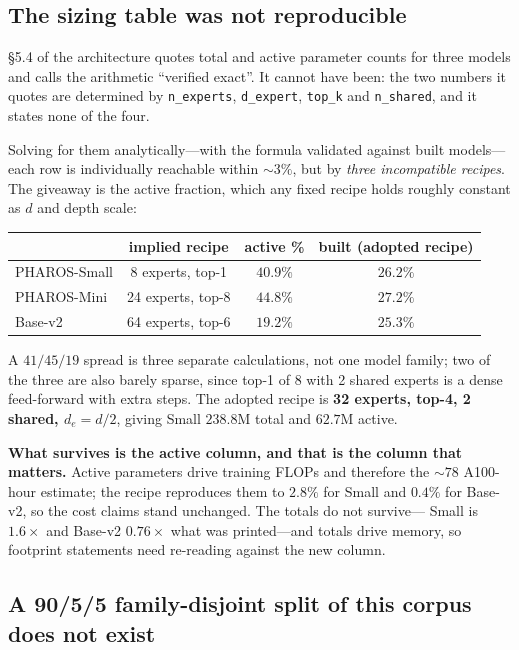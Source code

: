 \documentclass[11pt,a4paper]{article}
\begin{document}
\subsection{The sizing table was not reproducible}

\S5.4 of the architecture quotes total and active parameter counts for three
models and calls the arithmetic ``verified exact''. It cannot have been: the two
numbers it quotes are determined by \texttt{n\_experts}, \texttt{d\_expert},
\texttt{top\_k} and \texttt{n\_shared}, and it states none of the four.

Solving for them analytically---with the formula validated against built
models---each row is individually reachable within ${\sim}3\%$, but by
\emph{three incompatible recipes}. The giveaway is the active fraction, which
any fixed recipe holds roughly constant as $d$ and depth scale:

\begin{table}[h]
\centering
\small
\begin{tabular}{lccc}
\toprule
& \textbf{implied recipe} & \textbf{active \%} & \textbf{built (adopted recipe)} \\
\midrule
PHAROS-Small & 8 experts, top-1  & $40.9\%$ & $26.2\%$ \\
PHAROS-Mini  & 24 experts, top-8 & $44.8\%$ & $27.2\%$ \\
Base-v2      & 64 experts, top-6 & $19.2\%$ & $25.3\%$ \\
\bottomrule
\end{tabular}
\end{table}

\noindent
A $41 / 45 / 19$ spread is three separate calculations, not one model family;
two of the three are also barely sparse, since top-1 of 8 with 2 shared experts
is a dense feed-forward with extra steps. The adopted recipe is \textbf{32
experts, top-4, 2 shared, $d_e = d/2$}, giving Small $238.8$M total and
$\mathbf{62.7}$M active.

\textbf{What survives is the active column, and that is the column that
matters.} Active parameters drive training FLOPs and therefore the ${\sim}78$
A100-hour estimate; the recipe reproduces them to $2.8\%$ for Small and $0.4\%$
for Base-v2, so the cost claims stand unchanged. The totals do not survive---
Small is $1.6\times$ and Base-v2 $0.76\times$ what was printed---and totals
drive memory, so footprint statements need re-reading against the new column.

\subsection{A 90/5/5 family-disjoint split of this corpus does not exist}
\end{document}
